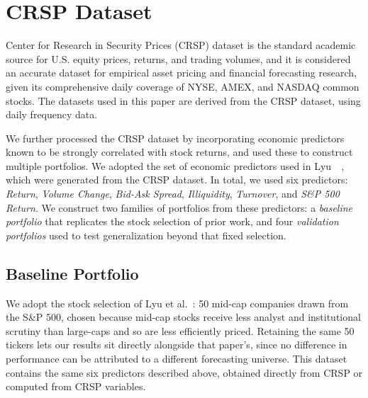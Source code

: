 %
%

\section{CRSP Dataset}
\label{sec:dataset}

Center for Research in Security Prices (CRSP) dataset is the standard academic source for U.S. equity prices, returns, and trading volumes, and it is considered an accurate dataset for empirical asset pricing and financial forecasting research, given its comprehensive daily coverage of NYSE, AMEX, and NASDAQ common stocks. The datasets used in this paper are derived from the CRSP dataset, using daily frequency data. 

We further processed the CRSP dataset by incorporating economic predictors known to be strongly correlated with stock returns, and used these to construct multiple portfolios. We adopted the set of economic predictors used in Lyu~\etal~\cite{lyu2025evostar}, which were generated from the CRSP dataset. In total, we used six predictors: \textit{Return}, \textit{Volume Change}, \textit{Bid-Ask Spread}, \textit{Illiquidity}, \textit{Turnover}, and \textit{S\&P 500 Return}. We construct two families of portfolios from these predictors: a \emph{baseline portfolio} that replicates the stock selection of prior work, and four \emph{validation portfolios} used to test generalization beyond that fixed selection.

\subsection{Baseline Portfolio}
\label{subsec:baseline-portfolio}
We adopt the stock selection of Lyu et al.~\cite{lyu2025evostar}: 50 mid-cap companies drawn from the S\&P 500, chosen because mid-cap stocks receive less analyst and institutional scrutiny than large-caps and so are less efficiently priced. Retaining the same 50 tickers lets our results sit directly alongside that paper's, since no difference in performance can be attributed to a different forecasting universe. This dataset contains the same six predictors described above, obtained directly from CRSP or computed from CRSP variables.


